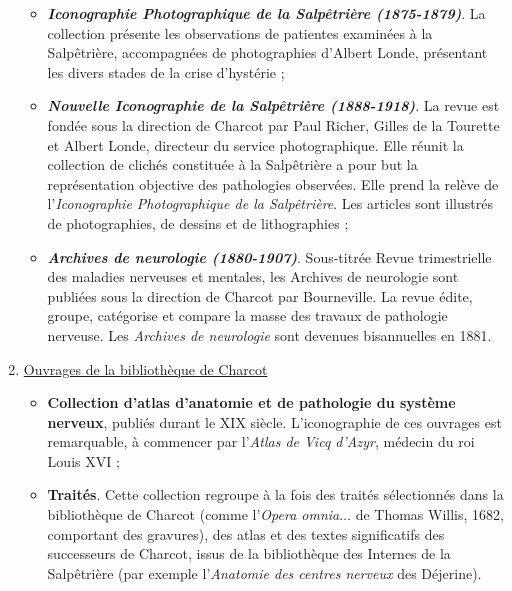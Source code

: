 \begin{enumerate}
\begin{itemize}
\item \textbf{\textit{Iconographie Photographique de la Salpêtrière (1875-1879)}}. La collection présente les observations de patientes examinées à la Salpêtrière, accompagnées de photographies d'Albert Londe, présentant les divers stades de la crise d'hystérie ;
\item \textbf{\textit{Nouvelle Iconographie de la Salpêtrière (1888-1918)}}. La revue est fondée sous la direction de Charcot par Paul Richer, Gilles de la Tourette et Albert Londe, directeur du service photographique. Elle réunit la collection de clichés constituée à la Salpêtrière a pour but la représentation objective des pathologies observées. Elle prend la relève de l'\textit{Iconographie Photographique de la Salpêtrière}. Les articles sont illustrés de photographies, de dessins et de lithographies ;
\item \textbf{\textit{Archives de neurologie (1880-1907)}}. Sous-titrée \og{}Revue trimestrielle des maladies nerveuses et mentales\fg{}, les Archives de neurologie sont publiées sous la direction de Charcot par Bourneville. La revue édite, groupe, catégorise et compare la masse des travaux de pathologie nerveuse. Les \textit{Archives de neurologie} sont devenues bisannuelles en 1881.
\end{itemize}
\item \underline{Ouvrages de la bibliothèque de Charcot}
\begin{itemize}
\item \textbf{Collection d'atlas d'anatomie et de pathologie du système nerveux}, publiés durant le XIX\ieme{} siècle. L'iconographie de ces ouvrages est remarquable, à commencer par l'\textit{Atlas de Vicq d'Azyr}, médecin du roi Louis XVI ;
\item \textbf{Traités}. Cette collection regroupe à la fois des traités sélectionnés dans la bibliothèque de Charcot (comme l'\textit{Opera omnia}$\dots$ de Thomas Willis, 1682, comportant des gravures), des atlas et des textes significatifs des successeurs de Charcot, issus de la bibliothèque des Internes de la Salpêtrière (par exemple l'\textit{Anatomie des centres nerveux} des Déjerine).
\end{itemize}
\end{enumerate}


